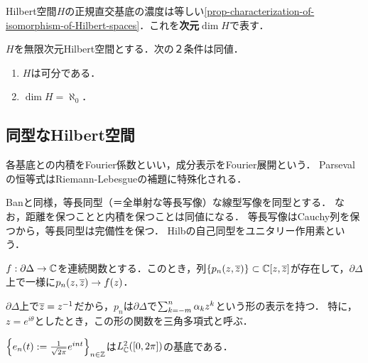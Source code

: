 \documentclass[uplatex,dvipdfmx]{jsreport}
\begin{document}
\begin{definition}[dimension]
    Hilbert空間$H$の正規直交基底の濃度は等しい\ref{prop-characterization-of-isomorphism-of-Hilbert-spaces}．これを\textbf{次元}$\dim H$で表す．
\end{definition}

\begin{proposition}
    $H$を無限次元Hilbert空間とする．次の２条件は同値．
    \begin{enumerate}
        \item $H$は可分である．
        \item $\dim H=\aleph_0$．
    \end{enumerate}
\end{proposition}

\subsection{同型なHilbert空間}

\begin{tcolorbox}[colframe=ForestGreen, colback=ForestGreen!10!white,breakable,colbacktitle=ForestGreen!40!white,coltitle=black,fonttitle=\bfseries\sffamily,
title=Hilbert空間の同型の典型的な例がFourier変換である]
    各基底との内積をFourier係数といい，成分表示をFourier展開という．
    Parsevalの恒等式はRiemann-Lebesgueの補題に特殊化される．

    Banと同様，等長同型（＝全単射な等長写像）な線型写像を同型とする．
    なお，距離を保つことと内積を保つことは同値になる．
    等長写像はCauchy列を保つから，等長同型は完備性を保つ．
    Hilbの自己同型をユニタリー作用素という．
\end{tcolorbox}

\begin{theorem}
    $f:\partial\Delta\to\mathbb{C}$を連続関数とする．このとき，列$\{p_n(z,\overline{z})\}\subset\mathbb{C}[z,\overline{z}]$が存在して，$\partial\Delta$上で一様に$p_n(z,\overline{z})\to f(z)$．
\end{theorem}
\begin{remarks}
    $\partial\Delta$上で$\overline{z}=z^{-1}$だから，$p_n$は$\partial\Delta$で$\sum^n_{k=-m}\alpha_kz^k$という形の表示を持つ．
    特に，$z=e^{i\theta}$としたとき，この形の関数を三角多項式と呼ぶ．
\end{remarks}

\begin{theorem}
    $\left\{e_n(t):=\frac{1}{\sqrt{2\pi}}e^{int}\right\}_{n\in\mathbb{Z}}$は$L^2_{\mathbb{C}}([0,2\pi])$の基底である．
\end{theorem}
\end{document}
